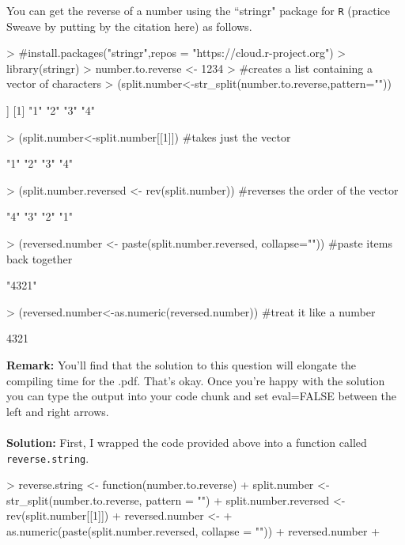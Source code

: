 \documentclass{article}
\begin{document}
\begin{enumerate}
  You can get the reverse of a number using the ``stringr" package for \texttt{R}
  (practice Sweave by putting by the citation here) as follows.
\begin{Schunk}
\begin{Sinput}
> #install.packages("stringr",repos = "https://cloud.r-project.org")
> library(stringr)
> number.to.reverse <- 1234
> #creates a list containing a vector of characters
> (split.number<-str_split(number.to.reverse,pattern=""))
\end{Sinput}
\begin{Soutput}
[[1]]
[1] "1" "2" "3" "4"
\end{Soutput}
\begin{Sinput}
> (split.number<-split.number[[1]]) #takes just the vector
\end{Sinput}
\begin{Soutput}
[1] "1" "2" "3" "4"
\end{Soutput}
\begin{Sinput}
> (split.number.reversed <- rev(split.number)) #reverses the order of the vector
\end{Sinput}
\begin{Soutput}
[1] "4" "3" "2" "1"
\end{Soutput}
\begin{Sinput}
> (reversed.number <- paste(split.number.reversed, collapse="")) #paste items back together
\end{Sinput}
\begin{Soutput}
[1] "4321"
\end{Soutput}
\begin{Sinput}
> (reversed.number<-as.numeric(reversed.number)) #treat it like a number
\end{Sinput}
\begin{Soutput}
[1] 4321
\end{Soutput}
\end{Schunk}
\textbf{Remark:} You'll find that the solution to this question will elongate the
compiling time for the .pdf. That's okay. Once you're happy with the solution 
you can type the output into your code chunk and set eval=FALSE between the left
and right arrows.\\\\

\textbf{Solution:} First, I wrapped the code provided above into a function called \texttt{reverse.string}.
\begin{Schunk}
\begin{Sinput}
> reverse.string <- function(number.to.reverse) {
+   split.number <- str_split(number.to.reverse, pattern = "")
+   split.number.reversed <- rev(split.number[[1]])
+   reversed.number <-
+     as.numeric(paste(split.number.reversed, collapse = ""))
+   reversed.number
+ }
\end{Sinput}
\end{Schunk}


\end{enumerate}
\end{document}
